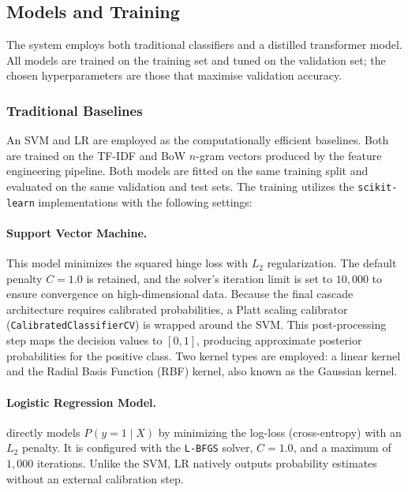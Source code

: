 \documentclass[a4paper,twoside,12pt]{book}
\newcommand{\logreg}{LR}
\newcommand{\code}[1]{\texttt{#1}}
\newcommand{\inputtext}{X}
\newcommand{\predVal}{y}
\newcommand{\probLarge}[2]{P_{#1}(\predVal=1 \mid #2)}
\begin{document}
\subsection{Models and Training} \label{sec:models}

The system employs both traditional classifiers and a distilled transformer model. All models are trained on the training set and tuned on the validation set; the chosen hyperparameters are those that maximise validation accuracy.

\subsubsection{Traditional Baselines} \label{sec:trad_models}

An SVM and \logreg{} are employed as the computationally efficient baselines. Both are trained on the TF-IDF and BoW $n$-gram vectors produced by the feature engineering pipeline. Both models are fitted on the same training split and evaluated on the same validation and test sets. The training utilizes the \code{scikit-learn} implementations with the following settings:

\paragraph{Support Vector Machine.} This model minimizes the squared hinge loss with $L_2$ regularization. The default penalty $C=1.0$ is retained, and the solver’s iteration limit is set to $10{,}000$ to ensure convergence on high-dimensional data. Because the final cascade architecture requires calibrated probabilities, a Platt scaling calibrator (\texttt{CalibratedClassifierCV}) is wrapped around the SVM. This post‑processing step maps the decision values to $[0,1]$, producing approximate posterior probabilities for the positive class. Two kernel types are employed: a linear kernel and the Radial Basis Function (RBF) kernel, also known as the Gaussian kernel.

\paragraph{Logistic Regression Model.} directly models $\probLarge{}{\inputtext}$ by minimizing the log-loss (cross-entropy) with an $L_2$ penalty. It is configured with the \code{L-BFGS} solver, $C=1.0$, and a maximum of $1{,}000$ iterations. Unlike the SVM, \logreg{} natively outputs probability estimates without an external calibration step.
\end{document}

